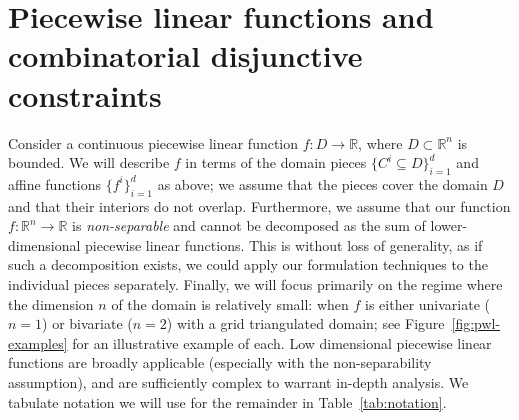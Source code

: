 \documentclass[opre,nonblindrev]{informs3} %
\newcommand{\bbR}{\mathbb{R}}
\begin{document}
\section{Piecewise linear functions and combinatorial disjunctive constraints}
Consider a continuous piecewise linear function $f : D \to \bbR$, where $D \subset \bbR^n$ is bounded. We will describe $f$ in terms of the domain pieces $\{C^i \subseteq D\}_{i=1}^d$ and affine functions $\{f^i\}_{i=1}^d$ as above; we assume that the pieces cover the domain $D$ and that their interiors do not overlap. Furthermore, we assume that our function $f: \mathbb{R}^n \to \bbR$ is \emph{non-separable} and cannot be decomposed as the sum of lower-dimensional piecewise linear functions. This is without loss of generality, as if such a decomposition exists, we could apply our formulation techniques to the individual pieces separately. Finally, we will focus primarily on the regime where the dimension $n$ of the domain is relatively small: when $f$ is either univariate ($n=1$) or bivariate ($n=2$) with a grid triangulated domain; see Figure~\ref{fig:pwl-examples} for an illustrative example of each. Low dimensional piecewise linear functions are broadly applicable (especially with the non-separability assumption), and are sufficiently complex to warrant in-depth analysis. We tabulate notation we will use for the remainder in Table~\ref{tab:notation}.
\end{document}
